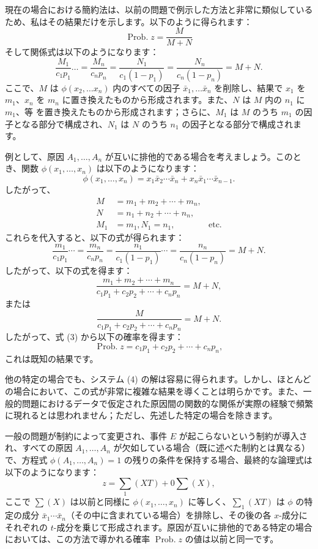 \documentclass[a4paper,11pt,openany]{ltjsbook}
\begin{document}
現在の場合における簡約法は、以前の問題で例示した方法と非常に類似しているため、私はその結果だけを示します。以下のように得られます：
\[
\operatorname{Prob. } z = \frac{M}{M+N}
\]
そして関係式は以下のようになります：
\[
\frac{M_1}{c_1 p_1} \dotsc = \frac{M_n}{c_n p_n} = \frac{N_1}{c_1 (1-p_1)} = \frac{N_n}{c_n(1-p_n)} = M+N.
\]
ここで、\(M\) は \(\phi(x_2, \dotsc x_n)\) 内のすべての因子 \(\bar{x}_1, \dotsc \bar{x}_n\) を削除し、結果で \(x_1\) を \(m_1\)、\(x_n\) を \(m_n\) に置き換えたものから形成されます。また、\(N\) は \(M\) 内の \(n_1\) に \(m_1\)、\(等\) を置き換えたものから形成されます；さらに、\(M_1\) は \(M\) のうち \(m_1\) の因子となる部分で構成され、\(N_1\) は \(N\) のうち \(n_1\) の因子となる部分で構成されます。

例として、原因 $A_1, \dotsc, A_n$ が互いに排他的である場合を考えましょう。このとき、関数 $\phi(x_1, \dotsc, x_n)$ は以下のようになります：
\[
\phi(x_1, \dotsc, x_n) = x_1 \bar{x}_2 \dotsm \bar{x}_n + x_n \bar{x}_1 \dotsm \bar{x}_{n-1}.
\]
したがって、
\begin{align*}
M &= m_1 + m_2 + \dotsb + m_n,\\
N &= n_1 + n_2 + \dotsb + n_n,\\
M_1 &= m_1, N_1 = n_1, & \text{etc.}
\end{align*}
これらを代入すると、以下の式が得られます：
\[
\frac{m_1}{c_1 p_1} \dotsb = \frac{m_n}{c_n p_n}
= \frac{n_1}{c_1 (1-p_1)} \dotsb
= \frac{n_n}{c_n (1-p_n)} = M + N.
\]
したがって、以下の式を得ます：
\[
\frac{m_1 + m_2 + \dotsb + m_n}
     {c_1 p_1 + c_2 p_2 + \dotsb + c_n p_n}
= M + N,
\]
または
\[
\frac{M}{c_1 p_1 + c_2 p_2 + \dotsb + c_n p_n} = M + N.
\]
したがって、式 (3) から以下の確率を得ます：
\[
\operatorname{Prob. } z = c_1 p_1 + c_2 p_2 + \dotsb + c_n p_n,
\]
これは既知の結果です。

他の特定の場合でも、システム (4) の解は容易に得られます。しかし、ほとんどの場合において、この式が非常に複雑な結果を導くことは明らかです。また、一般的問題におけるデータで仮定された原因間の関数的な関係が実際の経験で頻繁に現れるとは思われません；ただし、先述した特定の場合を除きます。

一般の問題が制約によって変更され、事件 $E$ が起こらないという制約が導入され、すべての原因 $A_1, \dotsc, A_n$ が欠如している場合（既に述べた制約とは異なる）で、方程式 $\phi(A_1, \dotsc, A_n) = 1$ の残りの条件を保持する場合、最終的な論理式は以下のようになります：
\[
z = \sum_1(XT) + 0 \sum(X),
\]
ここで $\sum(X)$ は以前と同様に $\phi(x_1, \dotsc, x_n)$ に等しく、$\sum_1(XT)$ は $\phi$ の特定の成分 $\bar{x}_1 \dotsm \bar{x}_n$（その中に含まれている場合）を排除し、その後の各 $x$-成分にそれぞれの $t$-成分を乗じて形成されます。原因が互いに排他的である特定の場合においては、この方法で導かれる確率 $\operatorname{Prob. } z$ の値は以前と同一です。
\end{document}
